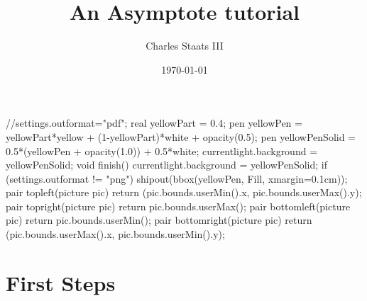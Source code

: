 \documentclass{article}
\title{An Asymptote tutorial}
\author{Charles Staats III}
\date{\today}
\begin{document}
\begin{asyheader}
//settings.outformat="pdf";
real yellowPart = 0.4;
pen yellowPen = yellowPart*yellow + (1-yellowPart)*white + opacity(0.5);
pen yellowPenSolid = 0.5*(yellowPen + opacity(1.0)) + 0.5*white;
currentlight.background = yellowPenSolid;
void finish() { 
	currentlight.background = yellowPenSolid;
	if (settings.outformat != "png") shipout(bbox(yellowPen, Fill, xmargin=0.1cm)); 
}
pair topleft(picture pic) { return (pic.bounds.userMin().x, pic.bounds.userMax().y); }
pair topright(picture pic) {return pic.bounds.userMax(); }
pair bottomleft(picture pic) {return pic.bounds.userMin(); }
pair bottomright(picture pic) {return (pic.bounds.userMax().x, pic.bounds.userMin().y); }
\end{asyheader}
\maketitle
\tableofcontents
\section{First Steps}
\end{document}
